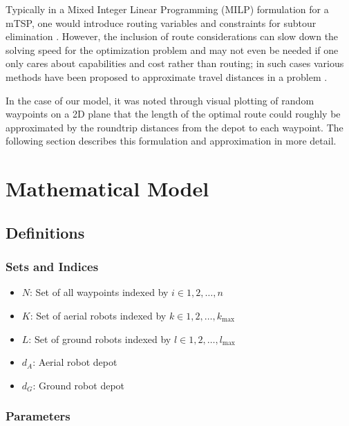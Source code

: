\documentclass{article}
\begin{document}
		Typically in a Mixed Integer Linear Programming (MILP) formulation for a mTSP, one would introduce routing variables and constraints for subtour elimination \cite{bektas2006multiple}. 
		However, the inclusion of route considerations can slow down the solving speed for the optimization problem and may not even be needed if one only cares about capabilities and cost rather than routing; in such cases various methods have been proposed to approximate travel distances in a problem \cite{NICOLA201967}.

		In the case of our model, it was noted through visual plotting of random waypoints on a 2D plane that the length of the optimal route could roughly be approximated by the roundtrip distances from the depot to each waypoint. 
		The following section describes this formulation and approximation in more detail.

	\section{Mathematical Model}\label{math_model}

		\subsection{Definitions}


			\subsubsection{Sets and Indices}

				\begin{itemize}
				\item $N$: Set of all waypoints indexed by $i \in {1, 2, \ldots, n}$
				\item $K$: Set of aerial robots indexed by $k \in {1, 2, \ldots, k_{\max}}$
				\item $L$: Set of ground robots indexed by $l \in {1, 2, \ldots, l_{\max}}$
				\item $d_A$: Aerial robot depot
				\item $d_G$: Ground robot depot
				\end{itemize}

			\subsubsection{Parameters}
\end{document}
